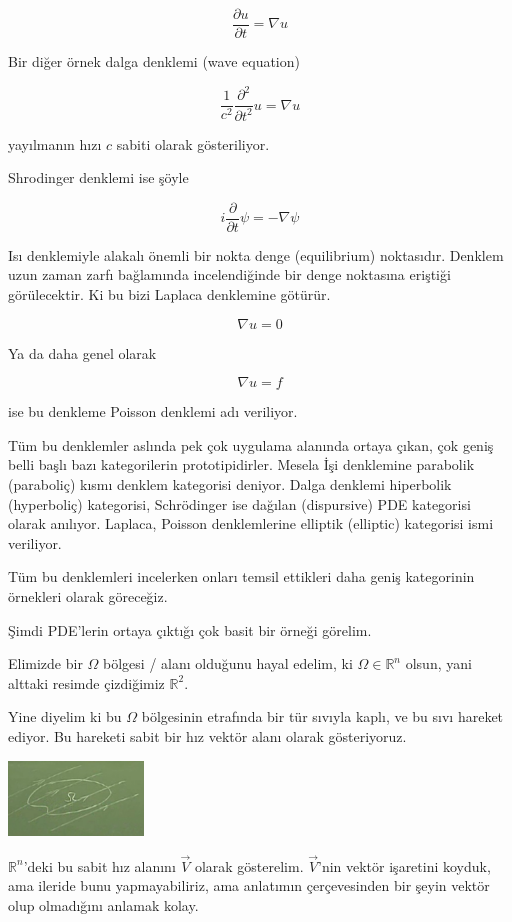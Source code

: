 \documentclass[12pt,fleqn]{article}\usepackage{../../common}
\begin{document}
$$ \frac{\partial u}{\partial t} = 
\nabla  u
$$

Bir diğer örnek dalga denklemi (wave equation)

$$ \frac{1}{c^2} \frac{\partial ^2}{\partial t^2}u = \nabla u$$

yayılmanın hızı $c$ sabiti olarak gösteriliyor. 

Shrodinger denklemi ise şöyle

$$ i \frac{\partial }{\partial t}\psi  = -\nabla \psi $$

Isı denklemiyle alakalı önemli bir nokta denge (equilibrium)
noktasıdır. Denklem uzun zaman zarfı bağlamında incelendiğinde bir denge
noktasına eriştiği görülecektir. Ki bu bizi Laplaca denklemine götürür. 

$$ \nabla u = 0 $$

Ya da daha genel olarak 

$$ \nabla u = f $$

ise bu denkleme Poisson denklemi adı veriliyor. 

Tüm bu denklemler aslında pek çok uygulama alanında ortaya çıkan, çok geniş
belli başlı bazı kategorilerin prototipidirler. Mesela İşi denklemine
parabolik (paraboliç) kısmı denklem kategorisi deniyor. Dalga denklemi
hiperbolik (hyperboliç) kategorisi, Schrödinger ise dağılan (dispursive)
PDE kategorisi olarak anılıyor. Laplaca, Poisson denklemlerine elliptik
(elliptic) kategorisi ismi veriliyor. 

Tüm bu denklemleri incelerken onları temsil ettikleri daha geniş
kategorinin örnekleri olarak göreceğiz. 

Şimdi PDE'lerin ortaya çıktığı çok basit bir örneği görelim. 

Elimizde bir $\Omega$ bölgesi / alanı olduğunu hayal edelim, ki $\Omega \in
\mathbb{R}^n$ olsun, yani alttaki resimde çizdiğimiz $\mathbb{R}^2$.

Yine diyelim ki bu $\Omega$ bölgesinin etrafında bir tür sıvıyla kaplı, ve
bu sıvı hareket ediyor. Bu hareketi sabit bir hız vektör alanı olarak
gösteriyoruz. 

\includegraphics[height=2cm]{1_1.png}

$\mathbb{R}^n$'deki bu sabit hız alanını $\vec{V}$ olarak gösterelim. $\vec{V}$'nin vektör işaretini 
koyduk, ama ileride bunu yapmayabiliriz, ama anlatımın çerçevesinden bir
şeyin  vektör olup olmadığını anlamak kolay. 
\end{document}
